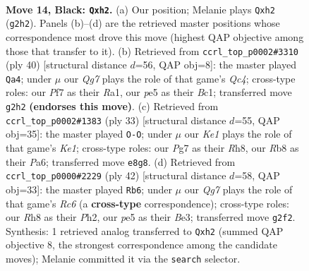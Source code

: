 \documentclass[11pt]{article}
\begin{document}
\clearpage

\begin{figure}[p]\centering
\begin{subfigure}{0.46\textwidth}\centering
\resizebox{\linewidth}{!}{%
\newchessgame
\chessboard[
  setfen={1rb1k2r/p1pp1pp1/2p4p/4P3/8/P2B4/P1P3qP/R1QKR3 b k - 0 14},
  showmover=false,
  pgfstyle=straightmove, color=movearrow, markmove={g2-h2}
]}
\caption{}
\end{subfigure}\hfill
\begin{subfigure}{0.46\textwidth}\centering
\resizebox{\linewidth}{!}{%
\newchessgame
\chessboard[
  setfen={r2qr1k1/2p2pp1/p3b2p/4P3/2Q5/2P4P/P4PP1/R1B1R1K1 w - - 1 21},
  showmover=false,
  pgfstyle=straightmove, color=movearrow, markmove={c4-a4}
]}
\caption{}
\end{subfigure}
\\[4pt]
\begin{subfigure}{0.46\textwidth}\centering
\resizebox{\linewidth}{!}{%
\newchessgame
\chessboard[
  setfen={1r2k2r/5pbp/p2p1p2/1pqP4/8/P4Q2/1PP1B1PP/2KR3R b k - 2 17},
  showmover=false,
  pgfstyle=straightmove, color=movearrow, markmove={e8-g8}
]}
\caption{}
\end{subfigure}\hfill
\begin{subfigure}{0.46\textwidth}\centering
\resizebox{\linewidth}{!}{%
\newchessgame
\chessboard[
  setfen={rq2k2r/4bppp/p1R1p3/3pP3/1p1Q4/1P2B3/P4PPP/R5K1 w kq - 4 22},
  showmover=false,
  pgfstyle=straightmove, color=movearrow, markmove={c6-b6}
]}
\caption{}
\end{subfigure}
\caption{\textbf{Move 14, Black: \texttt{Qxh2}.} (a) Our position; Melanie plays \texttt{Qxh2} (\texttt{g2h2}). Panels (b)--(d) are the retrieved master positions whose correspondence most drove this move (highest QAP objective among those that transfer to it). (b) Retrieved from \texttt{ccrl\_top\_p0002\#3310} (ply 40) [structural distance $d$=56, QAP obj=8]: the master played \texttt{Qa4}; under $\mu$ our \emph{Qg7} plays the role of that game's \emph{Qc4}; cross-type roles: our \emph{P}f7 as their \emph{R}a1, our \emph{p}e5 as their \emph{B}c1; transferred move \texttt{g2h2} \textbf{(endorses this move)}. (c) Retrieved from \texttt{ccrl\_top\_p0002\#1383} (ply 33) [structural distance $d$=55, QAP obj=35]: the master played \texttt{O-O}; under $\mu$ our \emph{Ke1} plays the role of that game's \emph{Ke1}; cross-type roles: our \emph{P}g7 as their \emph{R}h8, our \emph{R}b8 as their \emph{P}a6; transferred move \texttt{e8g8}. (d) Retrieved from \texttt{ccrl\_top\_p0000\#2229} (ply 42) [structural distance $d$=58, QAP obj=33]: the master played \texttt{Rb6}; under $\mu$ our \emph{Qg7} plays the role of that game's \emph{Rc6} (a \textbf{cross-type} correspondence); cross-type roles: our \emph{R}h8 as their \emph{P}h2, our \emph{p}e5 as their \emph{B}e3; transferred move \texttt{g2f2}. Synthesis: 1 retrieved analog transferred to \texttt{Qxh2} (summed QAP objective 8, the strongest correspondence among the candidate moves); Melanie committed it via the \texttt{search} selector.}
\label{fig:thought-m27}
\end{figure}
\end{document}
